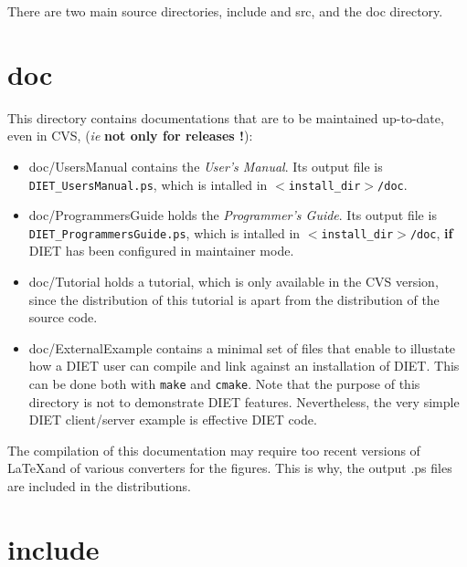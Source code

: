 

There are two main source directories, \textsf{include} and \textsf{src}, and
the \textsf{doc} directory.


\section{\textsf{doc}}
\label{s:doc}

This directory contains documentations that are to be maintained up-to-date,
even in CVS, (\emph{ie} \textbf{not only for releases !}):

  \begin{itemize}
  \item \textsf{doc/UsersManual} contains the \textit{User's Manual}. 
     Its output file is \texttt{DIET\_UsersManual.ps}, which is intalled in
     \texttt{$<$install\_dir$>$/doc}.
  \item \textsf{doc/ProgrammersGuide} holds the \textit{Programmer's Guide}.
     Its output file is \texttt{DIET\_ProgrammersGuide.ps}, which is intalled
     in \texttt{$<$install\_dir$>$/doc}, \textbf{if} DIET has been configured
     in maintainer mode.
  \item \textsf{doc/Tutorial} holds a tutorial, which is only available
     in the CVS version, since the distribution of this tutorial is apart
     from the distribution of the source code.
  \item \textsf{doc/ExternalExample} contains a minimal set of files
     that enable to illustate how a DIET user can compile and link
     against an installation of DIET.
     This can be done both with \verb+make+ and \verb+cmake+.
     Note that the purpose of this directory is not to demonstrate
     DIET features.
     Nevertheless, the very simple DIET client/server example is effective
     DIET code.
  \end{itemize}

  The compilation of this documentation may require too recent versions of
  \LaTeX and of various converters for the figures.
  This is why, the output \textsf{.ps} files are included in the distributions.

  \section{\textsf{include}}
  \label{s:include}

